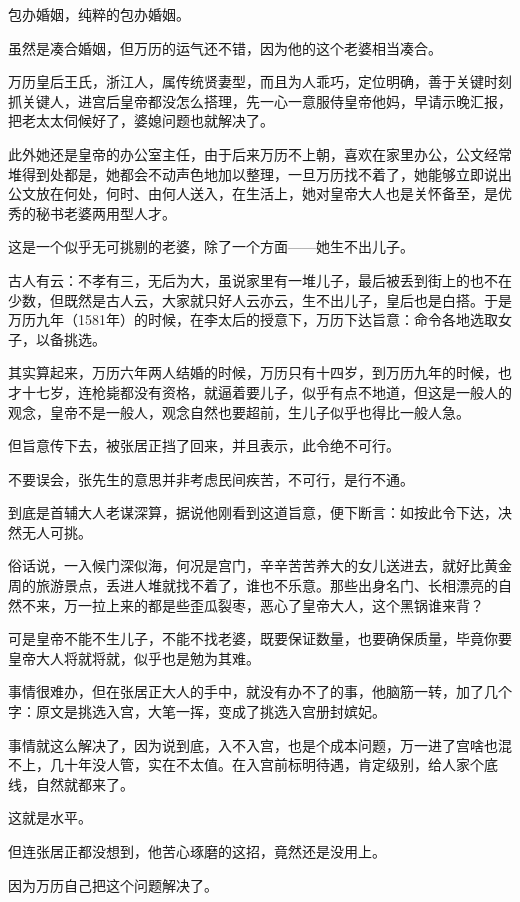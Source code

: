 \begin{multicols}{\theparacolNo}
		包办婚姻，纯粹的包办婚姻。

		虽然是凑合婚姻，但万历的运气还不错，因为他的这个老婆相当凑合。

		万历皇后王氏，浙江人，属传统贤妻型，而且为人乖巧，定位明确，善于关键时刻抓关键人，进宫后皇帝都没怎么搭理，先一心一意服侍皇帝他妈，早请示晚汇报，把老太太伺候好了，婆媳问题也就解决了。

		此外她还是皇帝的办公室主任，由于后来万历不上朝，喜欢在家里办公，公文经常堆得到处都是，她都会不动声色地加以整理，一旦万历找不着了，她能够立即说出公文放在何处，何时、由何人送入，在生活上，她对皇帝大人也是关怀备至，是优秀的秘书老婆两用型人才。

		这是一个似乎无可挑剔的老婆，除了一个方面——她生不出儿子。

		古人有云：不孝有三，无后为大，虽说家里有一堆儿子，最后被丢到街上的也不在少数，但既然是古人云，大家就只好人云亦云，生不出儿子，皇后也是白搭。于是万历九年（1581年）的时候，在李太后的授意下，万历下达旨意：命令各地选取女子，以备挑选。

		其实算起来，万历六年两人结婚的时候，万历只有十四岁，到万历九年的时候，也才十七岁，连枪毙都没有资格，就逼着要儿子，似乎有点不地道，但这是一般人的观念，皇帝不是一般人，观念自然也要超前，生儿子似乎也得比一般人急。

		但旨意传下去，被张居正挡了回来，并且表示，此令绝不可行。

		不要误会，张先生的意思并非考虑民间疾苦，不可行，是行不通。

		到底是首辅大人老谋深算，据说他刚看到这道旨意，便下断言：如按此令下达，决然无人可挑。

		俗话说，一入候门深似海，何况是宫门，辛辛苦苦养大的女儿送进去，就好比黄金周的旅游景点，丢进人堆就找不着了，谁也不乐意。那些出身名门、长相漂亮的自然不来，万一拉上来的都是些歪瓜裂枣，恶心了皇帝大人，这个黑锅谁来背？

		可是皇帝不能不生儿子，不能不找老婆，既要保证数量，也要确保质量，毕竟你要皇帝大人将就将就，似乎也是勉为其难。

		事情很难办，但在张居正大人的手中，就没有办不了的事，他脑筋一转，加了几个字：原文是挑选入宫，大笔一挥，变成了挑选入宫册封嫔妃。

		事情就这么解决了，因为说到底，入不入宫，也是个成本问题，万一进了宫啥也混不上，几十年没人管，实在不太值。在入宫前标明待遇，肯定级别，给人家个底线，自然就都来了。

		这就是水平。

		但连张居正都没想到，他苦心琢磨的这招，竟然还是没用上。

		因为万历自己把这个问题解决了。


\end{multicols}
